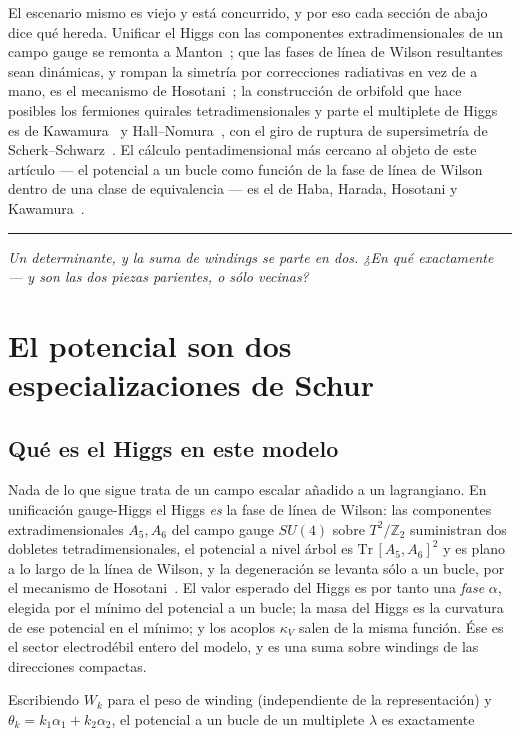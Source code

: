 \documentclass[11pt,a4paper]{article}
\newcommand{\ZZ}{\mathbb{Z}}
\newcommand{\su}[1]{SU(#1)}
\newcommand{\bridge}[1]{\par\medskip\noindent
  \textcolor{hdrblue!45}{\rule{2.2cm}{0.6pt}}\;\;\parbox[t]{0.84\textwidth}{\small\itshape
  \textcolor{hdrblue!85}{#1}}\par\medskip}
\begin{document}
El escenario mismo es viejo y está concurrido, y por eso cada sección de abajo dice qué hereda.
Unificar el Higgs con las componentes extradimensionales de un campo gauge se remonta a
Manton~\cite{Manton}; que las fases de línea de Wilson resultantes sean dinámicas, y rompan la
simetría por correcciones radiativas en vez de a mano, es el mecanismo de Hosotani~\cite{Hosotani};
la construcción de orbifold que hace posibles los fermiones quirales tetradimensionales y parte el
multiplete de Higgs es de Kawamura~\cite{Kawamura} y Hall--Nomura~\cite{HallNomura}, con el giro de
ruptura de supersimetría de Scherk--Schwarz~\cite{SS}. El cálculo pentadimensional más cercano al
objeto de este artículo --- el potencial a un bucle como función de la fase de línea de Wilson dentro
de una clase de equivalencia --- es el de Haba, Harada, Hosotani y Kawamura~\cite{HHHK}.

\bridge{Un determinante, y la suma de windings se parte en dos. ¿En qué exactamente --- y son las dos
piezas parientes, o sólo vecinas?}

\section{El potencial son dos especializaciones de Schur}\label{sec:two}

\subsection*{Qué es el Higgs en este modelo}

Nada de lo que sigue trata de un campo escalar añadido a un lagrangiano. En unificación gauge-Higgs
el Higgs \emph{es} la fase de línea de Wilson: las componentes extradimensionales $A_5,A_6$ del campo
gauge $\su4$ sobre $T^2/\ZZ_2$ suministran dos dobletes tetradimensionales, el potencial a nivel
árbol es $\mathrm{Tr}\,[A_5,A_6]^2$ y es plano a lo largo de la línea de Wilson, y la degeneración se
levanta sólo a un bucle, por el mecanismo de Hosotani~\cite{Hosotani}. El valor esperado del Higgs es
por tanto una \emph{fase} $\alpha$, elegida por el mínimo del potencial a un bucle; la masa del Higgs
es la curvatura de ese potencial en el mínimo; y los acoplos $\kappa_V$ salen de la misma función.
Ése es el sector electrodébil entero del modelo, y es una suma sobre windings de las direcciones
compactas.

Escribiendo $W_k$ para el peso de winding (independiente de la representación) y
$\theta_k=k_1\alpha_1+k_2\alpha_2$, el potencial a un bucle de un multiplete $\lambda$ es exactamente
\end{document}
